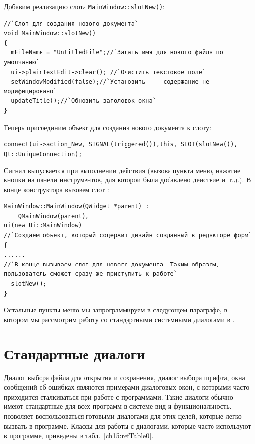 Добавим реализацию слота  \lstinline!MainWindow::slotNew()!:
\begin{lstlisting}
//`Слот для создания нового документа`
void MainWindow::slotNew()
{
  mFileName = "UntitledFile";//`Задать имя для нового файла по умолчанию`
  ui->plainTextEdit->clear(); //`Очистить текстовое поле`
  setWindowModified(false);//`Установить --- содержание не модифицировано`
  updateTitle();//`Обновить заголовок окна`
}
\end{lstlisting}

Теперь присоединим объект  для создания нового документа к слоту: 

\lstinline!connect(ui->action_New, SIGNAL(triggered()),this, SLOT(slotNew()), Qt::UniqueConnection);!

Сигнал выпускается при выполнении действия (вызова пункта меню, нажатие кнопки на панели инструментов, для которой была
добавлено действие и~т.д.). В конце конструктора вызовем слот : 
\begin{lstlisting}
MainWindow::MainWindow(QWidget *parent) :
    QMainWindow(parent),
ui(new Ui::MainWindow) 
//`Создаем объект, который содержит дизайн созданный в редакторе форм`
{
......
//`В конце вызываем слот для нового документа. Таким образом, пользователь сможет сразу же приступить к работе`
  slotNew();
}
\end{lstlisting}

Остальные пункты меню мы запрограммируем в следующем параграфе, в котором мы рассмотрим работу со стандартными
системными диалогами в . 

\section[Стандартные диалоги]{Стандартные диалоги}
Диалог выбора файла для открытия и сохранения, диалог выбора шрифта, окна сообщений об ошибках являются примерами
диалоговых окон, с которыми часто приходится сталкиваться при работе с программами. Такие диалоги обычно имеют
стандартные для всех программ в системе вид и функциональность.  позволяет воспользоваться готовыми диалогами для
этих целей, которые легко вызвать в программе. Классы для работы с диалогами, которые часто используют в программе,
приведены в табл.~\ref{ch15:refTable0}.

